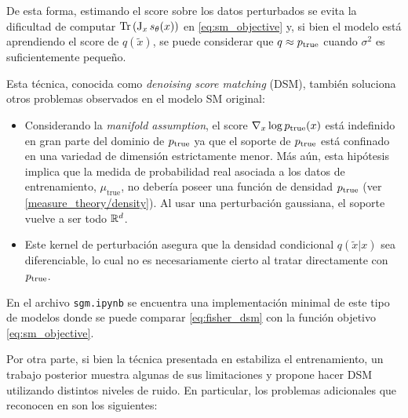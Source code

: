 De esta forma, estimando el score sobre los datos perturbados se evita la dificultad de computar $\operatorname{Tr}\left(\operatorname{J}_x s_\theta(x)\right)$ en \eqref{eq:sm_objective} y, si bien el modelo está aprendiendo el score de $q(\tilde{x})$, se puede considerar que $q\approx p_{\operatorname{true}}$ cuando $\sigma^2$ es suficientemente pequeño.

Esta técnica, conocida como \textit{denoising score matching} (DSM), también soluciona otros problemas observados en el modelo SM original:

\begin{itemize}
    \item Considerando la \textit{manifold assumption}, el score $\nabla_{x} \log p_{\operatorname{true}}(x)$ está indefinido en gran parte del dominio de $p_{\operatorname{true}}$ ya que el soporte de $p_{\operatorname{true}}$ está confinado en una variedad de dimensión estrictamente menor. Más aún, esta hipótesis implica que la medida de probabilidad real asociada a los datos de entrenamiento, $\mu_{\text{true}}$, no debería poseer una función de densidad $p_{\operatorname{true}}$ (ver \autoref{measure_theory/density}). Al usar una perturbación gaussiana, el soporte vuelve a ser todo $\mathbb{R}^d$.
    \item Este kernel de perturbación asegura que la densidad condicional $q(\tilde{x}|x)$ sea diferenciable, lo cual no es necesariamente cierto al tratar directamente con $p_{\operatorname{true}}$.
\end{itemize}

En el archivo \texttt{sgm.ipynb} se encuentra una implementación minimal de este tipo de modelos donde se puede comparar \eqref{eq:fisher_dsm} con la función objetivo \eqref{eq:sm_objective}.

Por otra parte, si bien la técnica presentada en \cite{DSM} estabiliza el entrenamiento, un trabajo posterior muestra algunas de sus limitaciones y propone hacer DSM utilizando distintos niveles de ruido. En particular, los problemas adicionales que reconocen en \cite{song2020generative} son los siguientes:

